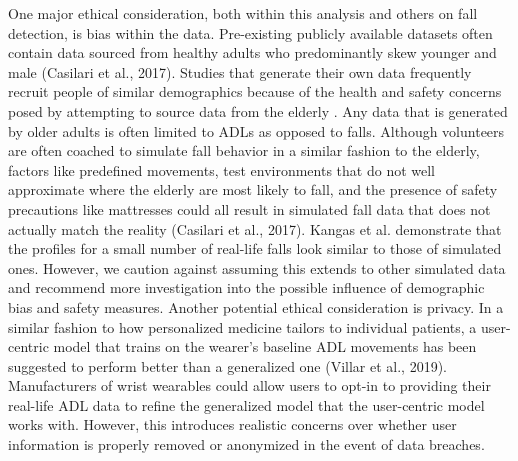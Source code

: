 \documentclass{llncs}
\begin{document}
     One major ethical consideration, both within this analysis and others on fall detection, is bias within the data. Pre-existing publicly available datasets often contain data sourced from healthy adults who predominantly skew younger and male (Casilari et al., 2017).\cite{casilari2017analysis} Studies that generate their own data frequently recruit people of similar demographics because of the health and safety concerns posed by attempting to source data from the elderly \cite{gjoreski2016accurately}. Any data that is generated by older adults is often limited to ADLs as opposed to falls. Although volunteers are often coached to simulate fall behavior in a similar fashion to the elderly, factors like predefined movements, test environments that do not well approximate where the elderly are most likely to fall, and the presence of safety precautions like mattresses could all result in simulated fall data that does not actually match the reality (Casilari et al., 2017).\cite{casilari2017analysis} Kangas et al. demonstrate that the profiles for a small number of real-life falls look similar to those of simulated ones.\cite{kangas2008comparison} However, we caution against assuming this extends to other simulated data and recommend more investigation into the possible influence of demographic bias and safety measures.
	Another potential ethical consideration is privacy. In a similar fashion to how personalized medicine tailors to individual patients, a user-centric model that trains on the wearer's baseline ADL movements has been suggested to perform better than a generalized one (Villar et al., 2019).\cite{villar2019online} Manufacturers of wrist wearables could allow users to opt-in to providing their real-life ADL data to refine the generalized model that the user-centric model works with. However, this introduces realistic concerns over whether user information is properly removed or anonymized in the event of data breaches.




%
%


 {}
 

\end{document}
